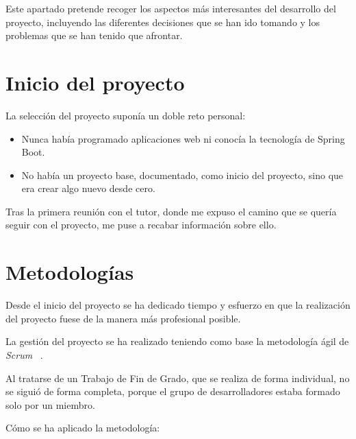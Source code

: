 
Este apartado pretende recoger los aspectos más interesantes del desarrollo del proyecto, incluyendo las diferentes decisiones que se han ido tomando y los problemas que se han tenido que afrontar.

\section{Inicio del proyecto}

La selección del proyecto suponía un doble reto personal:

\begin{itemize}
	\item Nunca había programado aplicaciones web ni conocía la tecnología de Spring Boot.
	\item No había un proyecto base, documentado, como inicio del proyecto, sino que era crear algo nuevo desde cero.
\end{itemize}

Tras la primera reunión con el tutor, donde me expuso el camino que se quería seguir con el proyecto, me puse a recabar información sobre ello.

\section{Metodologías}

Desde el inicio del proyecto se ha dedicado tiempo y esfuerzo en que la realización del proyecto fuese de la manera más profesional posible.

La gestión del proyecto se ha realizado teniendo como base la metodología ágil de \textit{Scrum} ~\cite{web:scrum}.

Al tratarse de un Trabajo de Fin de Grado, que se realiza de forma individual, no se siguió de forma completa, porque el grupo de desarrolladores estaba formado solo por un miembro.

Cómo se ha aplicado la metodología:

